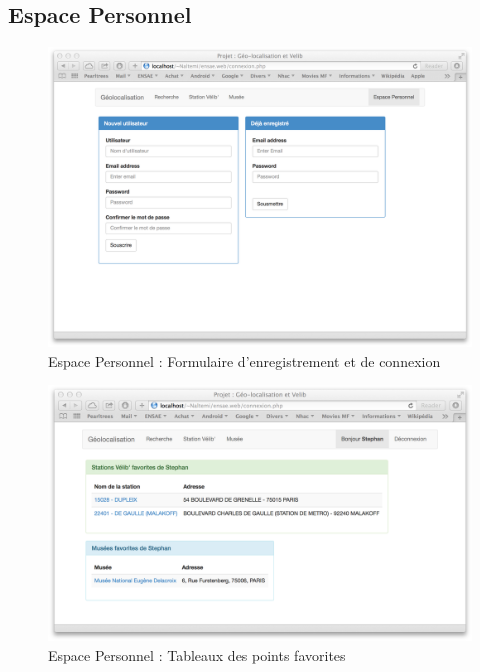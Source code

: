 \documentclass[a4paper]{article}
\begin{document}
\subsection{Espace Personnel}
\begin{figure}[!h]
\centering
\includegraphics[width = 13cm,keepaspectratio=TRUE]{connexion_2}
\caption{Espace Personnel : Formulaire d'enregistrement et de connexion}
\end{figure}
\begin{figure}[!h]
\centering
\includegraphics[width = 13cm,keepaspectratio=TRUE]{connexion_1}
\caption{Espace Personnel : Tableaux des points favorites}
\end{figure}
\end{document}
